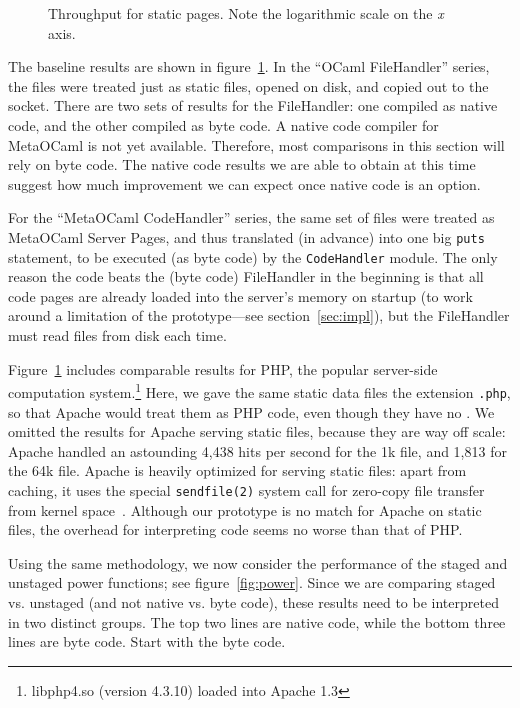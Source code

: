 \documentclass{elsart}
\def\MOC{MetaOCaml\xspace}
\newcommand{\myfig}[3]{%
  \begin{figure}[tbp]%
    #3%
    \caption{#2}%
    \label{fig:#1}%
  \end{figure}}
\newcommand{\gnuplot}[2]{%
  \myfig{#1}{#2}{\centering}}
\begin{document}
\gnuplot{static}{Throughput for static pages.  Note the logarithmic
  scale on the \textit x axis.}

The baseline results are shown in figure~\ref{fig:static}.  In the
``OCaml FileHandler'' series, the files were treated just as static
files, opened on disk, and copied out to the socket.  There are two
sets of results for the FileHandler: one compiled as native code, and
the other compiled as byte code.  A native code compiler for MetaOCaml
is not yet available.  Therefore, most comparisons in this section
will rely on byte code.  The native code results we are able to obtain
at this time suggest how much improvement we can expect once native
code is an option.

For the ``\MOC CodeHandler'' series, the same set of files were
treated as \MOC Server Pages, and thus translated (in advance) into
one big \texttt{puts} statement, to be executed (as byte code) by the
\texttt{CodeHandler} module.  The only reason the code beats the (byte
code) FileHandler in the beginning is that all code pages are already
loaded into the server's memory on startup (to work around a
limitation of the prototype---see section~\ref{sec:impl}), but the
FileHandler must read files from disk each time.

Figure~\ref{fig:static} includes comparable results for PHP, the
popular server-side computation system.\footnote{libphp4.so
  (version 4.3.10) loaded into Apache 1.3} Here, we gave the same
static data files the extension \texttt{.php}, so that Apache
would treat them as PHP code, even though they have no
.
We omitted the results for Apache serving static files, because they
are way off scale: Apache handled an astounding 4,438 hits per second
for the 1k file, and 1,813 for the 64k file.  Apache is heavily
optimized for serving static files: apart from caching, it uses the
special \texttt{sendfile(2)} system call for zero-copy file transfer
from kernel space~\cite{tranter03sendfile}.  Although our prototype is
no match for Apache on static files, the overhead for interpreting
code seems no worse than that of PHP.

Using the same methodology, we now consider the performance of the
staged and unstaged power functions; see figure~\ref{fig:power}.
Since we are comparing staged vs. unstaged (and not native vs. byte
code), these results need to be interpreted in two distinct groups.
The top two lines are native code, while the bottom three lines are
byte code.  Start with the byte code.
\end{document}
